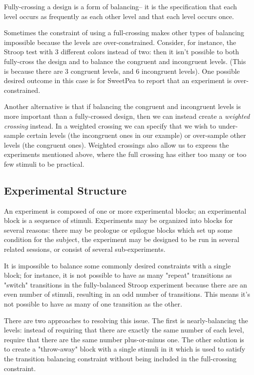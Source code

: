 Fully-crossing a design is a form of balancing-- it is the specification that each level occurs as frequently as each other level and that each level occurs once.

Sometimes the constraint of using a full-crossing makes other types of balancing impossible because the levels are over-constrained. Consider, for instance, the Stroop test with 3 different colors instead of two: then it isn't possible to both fully-cross the design and to balance the congruent and incongruent levels. (This is because there are 3 congruent levels, and 6 incongruent levels). One possible desired outcome in this case is for SweetPea to report that an experiment is over-constrained.

Another alternative is that if balancing the congruent and incongruent levels is more important than a fully-crossed design, then we can instead create a \emph{weighted crossing} instead. In a weighted crossing we can specify that we wish to under-sample certain levels (the incongruent ones in our example) or over-sample other levels (the congruent ones). Weighted crossings also allow us to express the experiments mentioned above, where the full crossing has either too many or too few stimuli to be practical.

\subsection{Experimental Structure}

An experiment is composed of one or more experimental blocks; an experimental block is a sequence of stimuli. Experiments may be organized into blocks for several reasons: there may be prologue or epilogue blocks which set up some condition for the subject, the experiment may be designed to be run in several related sessions, or consist of several sub-experiments.

It is impossible to balance some commonly desired constraints with a single block; for instance, it is not possible to have as many "repeat" transitions as "switch" transitions in the fully-balanced Stroop experiment because there are an even number of stimuli, resulting in an odd number of transitions. This means it's not possible to have as many of one transition as the other.

There are two approaches to resolving this issue. The first is nearly-balancing the levels: instead of requiring that there are exactly the same number of each level, require that there are the same number plus-or-minus one. The other solution is to create a "throw-away" block with a single stimuli in it which is used to satisfy the transition balancing constraint without being included in the full-crossing constraint.

